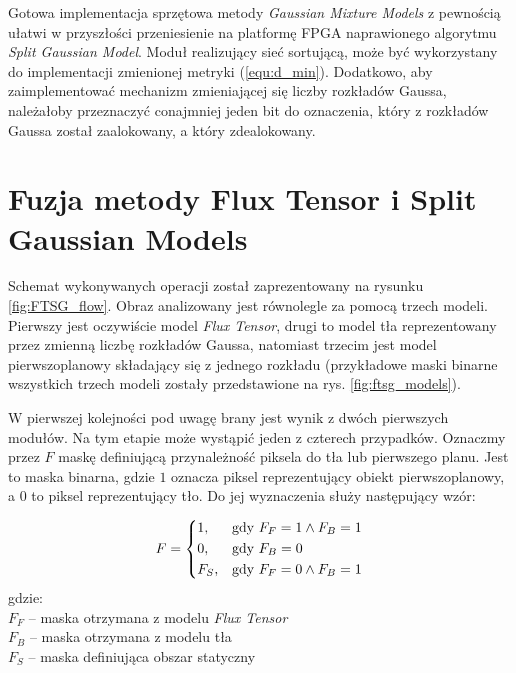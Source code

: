 \documentclass[10pt,a4paper]{article}
\begin{document}
Gotowa implementacja sprzętowa metody \textit{Gaussian Mixture Models} z pewnością ułatwi w przyszłości przeniesienie na platformę FPGA naprawionego algorytmu \textit{Split Gaussian Model}. Moduł realizujący sieć sortującą, może być wykorzystany  do implementacji zmienionej metryki (\ref{equ:d_min}). Dodatkowo, aby zaimplementować mechanizm zmieniającej się liczby rozkładów Gaussa, należałoby przeznaczyć conajmniej jeden bit do oznaczenia, który z rozkładów Gaussa został zaalokowany, a który zdealokowany.

\section{Fuzja metody Flux Tensor i Split Gaussian Models}
\label{sec:ftsg_fuzja}
Schemat wykonywanych operacji został zaprezentowany na rysunku \ref{fig:FTSG_flow}. Obraz analizowany jest równolegle za pomocą trzech modeli. Pierwszy jest oczywiście model \textit{Flux Tensor}, drugi to model tła reprezentowany przez zmienną liczbę rozkładów Gaussa, natomiast trzecim jest model pierwszoplanowy składający się z jednego rozkładu (przykładowe maski binarne wszystkich trzech modeli zostały przedstawione na rys. \ref{fig:ftsg_models}). 

W pierwszej kolejności pod uwagę brany jest wynik z dwóch pierwszych modułów. Na tym etapie może wystąpić jeden z czterech przypadków. Oznaczmy przez $F$ maskę definiującą przynależność piksela do tła lub pierwszego planu. Jest to maska binarna, gdzie $1$ oznacza piksel reprezentujący obiekt pierwszoplanowy, a $0$ to piksel reprezentujący tło. Do jej wyznaczenia służy następujący wzór:

\begin{equation}
    F= 
\begin{dcases}
    1,   & \text{gdy }  F_F = 1 \land F_B = 1\\
    0,   & \text{gdy }  F_B = 0\\ 
    F_S, & \text{gdy }  F_F = 0 \land F_B = 1\\
\end{dcases}
\label{equ:final_mask}
\end{equation}
gdzie:\\
	\-\hspace{1cm} $F_F$ -- maska otrzymana z modelu \textit{Flux Tensor}\\
	\-\hspace{1cm} $F_B$ -- maska otrzymana z modelu tła\\
	\-\hspace{1cm} $F_S$ -- maska definiująca obszar statyczny \\
\end{document}
